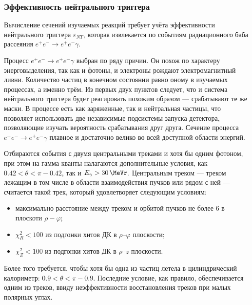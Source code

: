 \subsubsection{Эффективность нейтрального триггера}

Вычисление сечений изучаемых реакций требует учёта эффективности нейтрального триггера $\varepsilon_{NT}$,
которая извлекается по событиям радиационного баба рассеяния $e^+e^- \to e^+e^-\gamma$.


Процесс $e^+e^- \to e^+e^-\gamma$ выбран по ряду причин.
Он похож по характеру энерговыделения,
так как и фотоны,
и электроны рождают электромагнитный ливни.
Количество частиц в конечном состоянии равно оному в изучаемых процессах,
а именно трём.
Из первых двух пунктов следует,
что и система нейтрального триггера будет реагировать похожим образом
---
срабатывают те же маски.
В процессе есть как заряженные,
так и нейтральная частицы,
что позволяет использовать две независимые подсистемы запуска детектора,
позволяющие изучать вероятность срабатывания друг друга.
Сечение процесса $e^+e^- \to e^+e^-\gamma$ плавное и достаточно велико во всей доступной области энергий.


Отбираются события с двумя центральными треками и хотя бы одним фотоном,
при этом на гамма-кванты налагаются дополнительные условия, 
как $0.42 < \theta < \pi - 0.42$, 
так и $E_\gamma > \SI{30}{\MeVr}$.
Центральным треком
---
треком лежащим в том числе в области взаимодействия пучков или рядом с ней
---
считается такой трек,
который удовлетворяет следующим условиям:
\begin{itemize}
	\item максимально расстояние между треком и орбитой пучков не более \SI{6}{\cmr} в плоскоти $\rho-\varphi$;
	\item $\chi^2_{R} < 100$ из подгонки хитов ДК в $\rho$--$\varphi$ плоскости;
	\item $\chi^2_{Z} < 100$ из подгонки хитов ДК в $\rho$--$z$ плоскости.
\end{itemize}
Более того требуется, чтобы хотя бы одна из частиц летела в цилиндрический калориметр:
$ 0.9 < \theta < \pi - 0.9 $.
Последние условие,
как правило,
обеспечивается одним из треков,
ввиду неэффективности восстановления треков при малых полярных углах.

